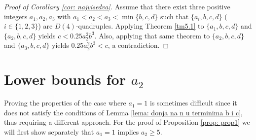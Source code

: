 \documentclass[12pt]{amsart}%
\theoremstyle{definition}
\theoremstyle{remark}
\theoremstyle{plain}
\begin{document}
\begin{proof}[Proof of Corollary \ref{cor: najvisedva}] Assume that there exist three positive integers $a_1, a_2, a_3$ with $a_1 < a_2 < a_3 < \min\{b,c,d\}$ such that $\{a_i,b,c,d\}$ ($i \in \{1,2,3\}$) are $D(4)$-quadruples. Applying Theorem \ref{tm5.1} to $\{a_1,b,c,d\}$ and $\{a_2,b,c,d\}$ yields $c<0.25a_2^2b^3$. Also, applying that same theorem to $\{a_2,b,c,d\}$ and $\{a_3,b,c,d\}$ yields $0.25a_2^2b^3 < c$, a contradiction.
\end{proof}

\section{Lower bounds for $a_2$}\label{sekcija_bound_1}

Proving the properties of the case where $a_1=1$ is sometimes difficult since it does not satisfy the conditions of Lemma \ref{lema: donja na n u terminima b i c}, thus requiring a different approach. For the proof of Proposition \ref{prop: prop1} we will first show separately that $a_1=1$ implies $a_2\geq 5$. 
\end{document}
